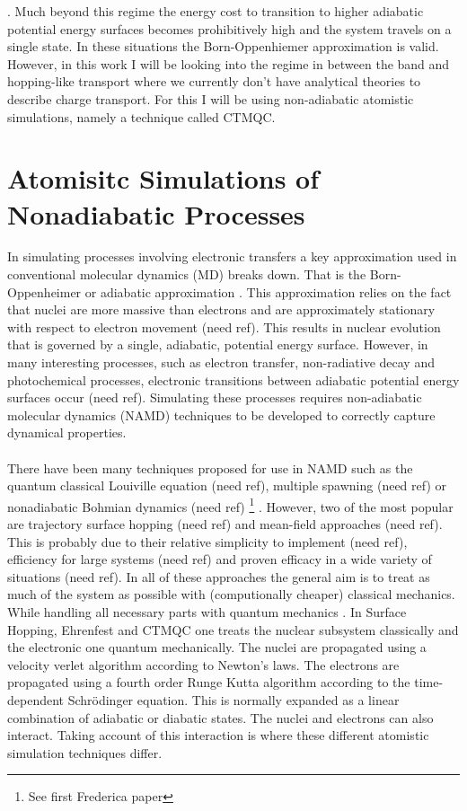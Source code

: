 \cite{oberhofer_charge_2017, gajdos_ultrafast_2014, Gershenson2006Sep}. Much beyond this regime the energy cost to transition to higher adiabatic potential energy surfaces becomes prohibitively high and the system travels on a single state. In these situations the Born-Oppenhiemer approximation is valid. However, in this work I will be looking into the regime in between the band and hopping-like transport where we currently don't have  analytical theories to describe charge transport. For this I will be using non-adiabatic atomistic simulations, namely a technique called CTMQC.
\section{Atomisitc Simulations of Nonadiabatic Processes}
In simulating processes involving electronic transfers a key approximation used in conventional molecular dynamics (MD) breaks down. That is the Born-Oppenheimer or adiabatic approximation \cite{john_c._tully_nonadiabatic_nodate}. This approximation relies on the fact that nuclei are more massive than electrons and are approximately stationary with respect to electron movement (need ref). This results in nuclear evolution that is governed by a single, adiabatic, potential energy surface. However, in many interesting processes, such as electron transfer, non-radiative decay and photochemical processes, electronic transitions between adiabatic potential energy surfaces occur (need ref). Simulating these processes requires non-adiabatic molecular dynamics (NAMD) techniques to be developed to correctly capture dynamical properties.
\\\\
There have been many techniques proposed for use in NAMD such as the quantum classical Louiville equation (need ref), multiple spawning (need ref) or nonadiabatic Bohmian dynamics (need ref) \footnote{See first Frederica paper} . However, two of the most popular are trajectory surface hopping (need ref) and mean-field approaches (need ref). This is probably due to their relative simplicity to implement (need ref), efficiency for large systems (need ref) and proven efficacy in a wide variety of situations (need ref). In all of these approaches the general aim is to treat as much of the system as possible with (computionally cheaper) classical mechanics. While handling all necessary parts with quantum mechanics \cite{Coker1995Jan}. In Surface Hopping, Ehrenfest and CTMQC one treats the nuclear subsystem classically and the electronic one quantum mechanically. The nuclei are propagated using a velocity verlet algorithm according to Newton's laws. The electrons are propagated using a fourth order Runge Kutta algorithm according to the time-dependent Schr\"odinger equation. This is normally expanded as a linear combination of adiabatic or diabatic states. The nuclei and electrons can also interact. Taking account of this interaction is where these different atomistic simulation techniques differ.

